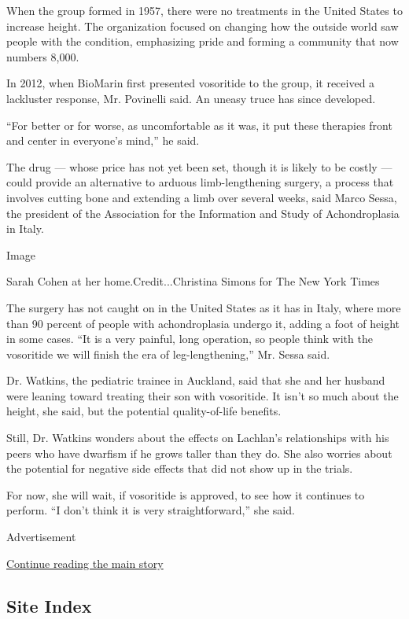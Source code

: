 When the group formed in 1957, there were no treatments in the United
States to increase height. The organization focused on changing how the
outside world saw people with the condition, emphasizing pride and
forming a community that now numbers 8,000.

In 2012, when BioMarin first presented vosoritide to the group, it
received a lackluster response, Mr. Povinelli said. An uneasy truce has
since developed.

``For better or for worse, as uncomfortable as it was, it put these
therapies front and center in everyone's mind,'' he said.

The drug --- whose price has not yet been set, though it is likely to be
costly --- could provide an alternative to arduous limb-lengthening
surgery, a process that involves cutting bone and extending a limb over
several weeks, said Marco Sessa, the president of the Association for
the Information and Study of Achondroplasia in Italy.

Image

Sarah Cohen at her home.Credit...Christina Simons for The New York Times

The surgery has not caught on in the United States as it has in Italy,
where more than 90 percent of people with achondroplasia undergo it,
adding a foot of height in some cases. ``It is a very painful, long
operation, so people think with the vosoritide we will finish the era of
leg-lengthening,'' Mr. Sessa said.

Dr. Watkins, the pediatric trainee in Auckland, said that she and her
husband were leaning toward treating their son with vosoritide. It isn't
so much about the height, she said, but the potential quality-of-life
benefits.

Still, Dr. Watkins wonders about the effects on Lachlan's relationships
with his peers who have dwarfism if he grows taller than they do. She
also worries about the potential for negative side effects that did not
show up in the trials.

For now, she will wait, if vosoritide is approved, to see how it
continues to perform. ``I don't think it is very straightforward,'' she
said.

Advertisement

\protect\hyperlink{after-bottom}{Continue reading the main story}

\hypertarget{site-index}{%
\subsection{Site Index}\label{site-index}}

